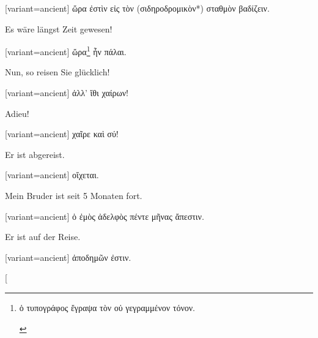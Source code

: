 \switchcolumn

\begin{greek}[variant=ancient]%
ὥρα ἐστὶν εἰς τὸν (σιδηροδρομικὸν{*}) σταθμὸν βαδίζειν.

\end{greek}%
\switchcolumn*

Es wäre längst Zeit gewesen!

\switchcolumn

\begin{greek}[variant=ancient]%
ὥρα\footnote{\begin{latin}%
\textgreek[variant=ancient]{ὁ τυπογράφος ἔγραψα τὸν οὐ γεγραμμένον
τόνον.}\end{latin}%
} ἦν πάλαι.

\end{greek}%
\switchcolumn*

Nun, so reisen Sie glücklich!

\switchcolumn

\begin{greek}[variant=ancient]%
ἀλλ' ἴθι χαίρων!

\end{greek}%
\switchcolumn*

Adieu!

\switchcolumn

\begin{greek}[variant=ancient]%
χαῖρε καὶ σύ!

\end{greek}%
\switchcolumn*

Er ist abgereist.

\switchcolumn

\begin{greek}[variant=ancient]%
οἴχεται.

\end{greek}%
\switchcolumn*

Mein Bruder ist seit 5 Monaten fort.

\switchcolumn

\begin{greek}[variant=ancient]%
ὁ ἐμὸς ἀδελφὸς πέντε μῆνας ἄπεστιν.

\end{greek}%
\switchcolumn*

Er ist auf der Reise.

\switchcolumn

\begin{greek}[variant=ancient]%
ἀποδημῶν ἐστιν.

\end{greek}%
\switchcolumn*[


